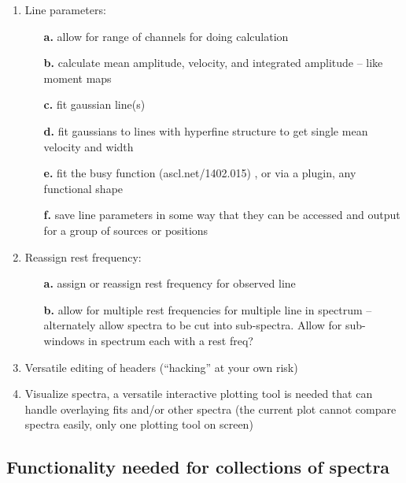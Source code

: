 \documentclass[12pt,a4paper]{article}
\begin{document}
\begin{enumerate}
\item Line parameters:
  \begin{itemize}
  \item[{\bf a.}]
   allow for range of channels for doing calculation
  \item[{\bf b.}]
   calculate mean amplitude, velocity, and integrated
        amplitude -- like moment maps
  \item[{\bf c.}]
   fit gaussian line(s)
  \item[{\bf d.}]
   fit gaussians to lines with hyperfine structure to get
           single mean velocity and width
  \item[{\bf e.}]
   fit the busy function (ascl.net/1402.015) , or via a plugin, any functional shape
  \item[{\bf f.}]
   save line parameters in some way that they can be
           accessed and output for a group of sources or
	   positions
  \end{itemize}

\item Reassign rest frequency:
  \begin{itemize}
  \item[{\bf a.}]   
   assign or reassign rest frequency for observed line
  \item[{\bf b.}]   
   allow for multiple rest frequencies for multiple line
             in spectrum -- alternately allow spectra to
	     be cut into sub-spectra. Allow for sub-windows
	     in spectrum each with a rest freq?
  \end{itemize}

\item Versatile editing of headers (``hacking'' at your own risk)

\item  Visualize spectra, a versatile interactive plotting tool is needed
  that can handle overlaying fits and/or other spectra (the current plot cannot compare spectra easily,
  only one plotting tool on screen)

  
\end{enumerate}


\subsection{Functionality needed for collections of spectra}
\end{document}
